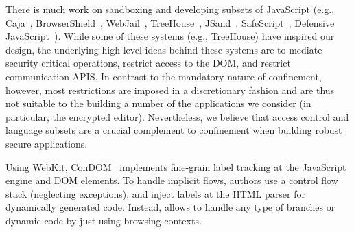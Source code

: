 There is much work on sandboxing and developing subsets of JavaScript (e.g.,
Caja~\cite{GoogleCaja}, BrowserShield~\cite{Reis:2007},
WebJail~\cite{VanAcker:2011}, TreeHouse~\cite{Ingram:2012},
JSand~\cite{Agten:2012:JCC}, SafeScript~\cite{SafeScript}, Defensive
JavaScript~\cite{djs}). 
%
While some of these systems (e.g., TreeHouse) have inspired our design, the
underlying high-level ideas behind these systems are to mediate security
critical operations, restrict access to the DOM, and restrict communication APIS.
%
In contrast to the mandatory nature of confinement, however, most restrictions
are imposed in a discretionary fashion and are thus not suitable to the
building a number of the applications we consider (in particular, the encrypted
editor).
%
Nevertheless, we believe that access control and language subsets are a crucial
complement to confinement when building robust secure applications.

 

Using WebKit, ConDOM~\cite{ConDOM} implements fine-grain label tracking at the
JavaScript engine and DOM elements. To handle implicit flows, authors use a
control flow stack (neglecting exceptions), and inject labels at the HTML parser
for dynamically generated code. Instead, \sys{} allows to handle any type of
branches or dynamic code by just using browsing contexts.





